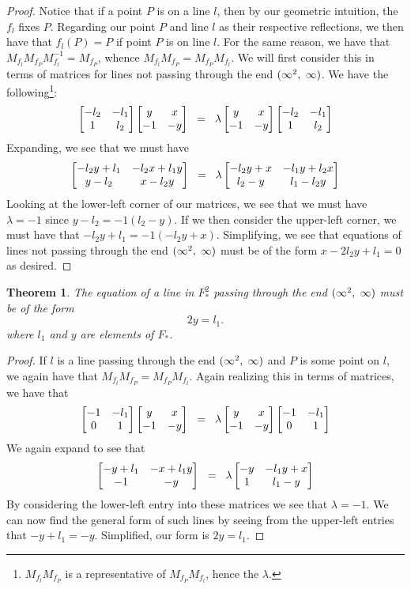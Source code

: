 \documentclass[12pt]{article}
\newcommand{\lftmat}[4]{\begin{bmatrix} {#1} & {#2} \\ {#3} & {#4} \end{bmatrix}}
\newcommand{\pointmat}[2]{\lftmat{{#2}}{{#1}}{-1}{-{#2}}}
\newcommand{\stanpointmat}{\pointmat{x}{y}}
\newcommand{\linenoendmat}[2]{\begin{bmatrix} -{#2} & -{#1} \\ 1 & {#2} \end{bmatrix}}
\newcommand{\stanlinenoendmat}{\linenoendmat{l_1}{l_2}}
\newcommand{\lineendmat}[2]{\begin{bmatrix} -1 & -{#1} \\ 0 & 1 \end{bmatrix}}
\newcommand{\stanlineendmat}{\lineendmat{l_1}{l_2}}
\newcommand{\spceq}{\hspace{2mm} = \hspace{2mm}}
\newcommand{\ttc}{, \hspace{1mm}}
\newcommand{\inv}{^{-1}}
\newcommand{\specialend}{(\infty^2\ttc\infty)}
\theoremstyle{plain}
\newtheorem{theorem}{Theorem}[section]
\theoremstyle{definition}
\begin{document}
\begin{proof}
Notice that if a point $P$ is on a line $l$, then by our geometric intuition, the $f_l$ fixes $P$. Regarding our point $P$ and line $l$ as their respective reflections, we then have that $f_l(P) = P$ if point $P$ is on line $l$. For the same reason, we have that $M_{f_l} M_{f_P} M_{f_l}\inv = M_{f_P}$, whence $M_{f_l} M_{f_P} = M_{f_P} M_{f_l}$. We will first consider this in terms of matrices for lines not passing through the end $\specialend$. We have the following\footnote{$M_{f_l} M_{f_P}$ is a representative of $M_{f_P} M_{f_l}$, hence the $\lambda$.}:
\begin{equation} 
\stanlinenoendmat\stanpointmat \spceq \lambda \stanpointmat\stanlinenoendmat
\end{equation}	
Expanding, we see that we must have
	\[
		\lftmat{-l_2y+l_1}{-l_2x+l_1y}{y-l_2}{x-l_2y} \spceq \lambda \lftmat{-l_2y+x}{-l_1y+l_2x}{l_2-y}{l_1-l_2y}
	\]
Looking at the lower-left corner of our matrices, we see that we must have $\lambda = -1$ since $y - l_2 = -1(l_2 - y)$. If we then consider the upper-left corner, we must have that $-l_2y + l_1 = -1(-l_2y + x)$. Simplifying, we see that equations of lines not passing through the end $\specialend$ must be of the form $x - 2l_2y + l_1  = 0$ as desired.
\end{proof}

\begin{theorem} The equation of a line in $F_*^2$ passing through the end $\specialend$ must be of the form 
\begin{equation}
	2y = l_1.
\end{equation} 
where $l_1$ and $y$ are elements of $F_*$.
\end{theorem}

\begin{proof} If $l$ is a line passing through the end $\specialend$ and $P$ is some point on $l$, we again have that $M_{f_l} M_{f_P} = M_{f_P} M_{f_l}$. Again realizing this in terms of matrices, we have that 
\begin{equation} 
	\stanlineendmat\stanpointmat \spceq \lambda \stanpointmat\stanlineendmat
\end{equation}	
We again expand to see that 
	\[
		\lftmat{-y+l_1}{-x+l_1y}{-1}{-y} \spceq \lambda \lftmat{-y}{-l_1y+x}{1}{l_1-y}
	\]
By considering the lower-left entry into these matrices we see that $\lambda = -1$. We can now find the general form of such lines by seeing from the upper-left entries that $-y+l_1 = -y$. Simplified, our form is $2y = l_1$. 
\end{proof}
\end{document}
